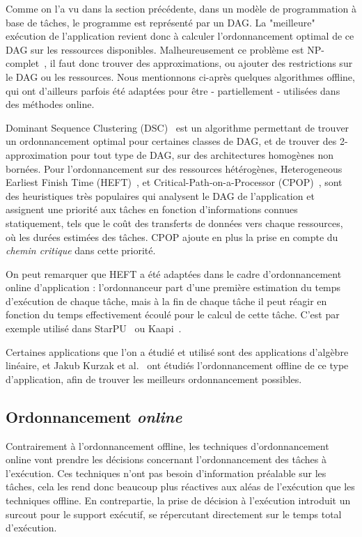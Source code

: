 Comme on l'a vu dans la section précédente, dans un modèle de programmation à base de tâches, le programme est représenté par un DAG.
La "meilleure" exécution de l'application revient donc à calculer l'ordonnancement optimal de ce DAG sur les ressources disponibles.
Malheureusement ce problème est NP-complet~\cite{Cook1971}, il faut donc trouver des approximations, ou ajouter des restrictions sur le DAG ou les ressources.
Nous mentionnons ci-après quelques algorithmes offline, qui ont d'ailleurs parfois été adaptées pour être - partiellement - utilisées dans des méthodes online.

Dominant Sequence Clustering (DSC)~\cite{Yang1994} est un algorithme permettant de trouver un ordonnancement optimal pour certaines classes de DAG, et de trouver des 2-approximation pour tout type de DAG, sur des architectures homogènes non bornées.
Pour l'ordonnancement sur des ressources hétérogènes, Heterogeneous Earliest Finish Time (HEFT)~\cite{HEFT}, et Critical-Path-on-a-Processor (CPOP)~\cite{HEFT}, sont des heuristiques très populaires qui analysent le DAG de l'application et assignent une priorité aux tâches en fonction d'informations connues statiquement, tels que le coût des transferts de données vers chaque ressources, où les durées estimées des tâches.
CPOP ajoute en plus la prise en compte du \emph{chemin critique} dans cette priorité.

On peut remarquer que HEFT a été adaptées dans le cadre d'ordonnancement online d'application : l'ordonnanceur part d'une première estimation du temps d'exécution de chaque tâche, mais à la fin de chaque tâche il peut réagir en fonction du temps effectivement écoulé pour le calcul de cette tâche. C'est par exemple utilisé dans StarPU~\cite{StarPU} ou Kaapi~\cite{Lima2015}.

Certaines applications que l'on a étudié et utilisé sont des applications d'algèbre linéaire, et Jakub Kurzak et al.~\cite{Kurzak2010} ont étudiés l'ordonnancement offline de ce type d'application, afin de trouver les meilleurs ordonnancement possibles.



\subsection{Ordonnancement \emph{online}}

Contrairement à l'ordonnancement offline, les techniques d'ordonnancement online vont prendre les décisions concernant l'ordonnancement des tâches à l'exécution.
Ces techniques n'ont pas besoin d'information préalable sur les tâches, cela les rend donc beaucoup plus réactives aux aléas de l'exécution que les techniques offline.
En contrepartie, la prise de décision à l'exécution introduit un surcout pour le support exécutif, se répercutant directement sur le temps total d'exécution.


